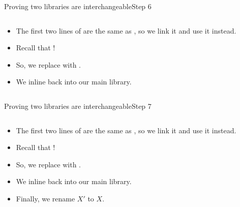 \documentclass[aspectratio=169, lualatex, handout]{beamer}
\begin{document}
\begin{frame}{Proving two libraries are interchangeable}{Step 6}
	\begin{columns}[c]
		\begin{column}{0.5\textwidth}
			\begin{itemize}
				\item The first two lines of  are the same as , so we link it and use it instead.
				\item Recall that  \interchangeable{} !
				\item So, we replace  with .
				\item We inline  back into our main library.
			\end{itemize}
		\end{column}
		\begin{column}{0.5\textwidth}
			\begin{center}
			\end{center}
		\end{column}
	\end{columns}
\end{frame}

\begin{frame}{Proving two libraries are interchangeable}{Step 7}
	\begin{columns}[c]
		\begin{column}{0.5\textwidth}
			\begin{itemize}
				\item The first two lines of  are the same as , so we link it and use it instead.
				\item Recall that  \interchangeable{} !
				\item So, we replace  with .
				\item We inline  back into our main library.
				\item Finally, we rename $X'$ to $X$.
			\end{itemize}
		\end{column}
		\begin{column}{0.5\textwidth}
			\begin{center}
			\end{center}
		\end{column}
	\end{columns}
\end{frame}
\end{document}
